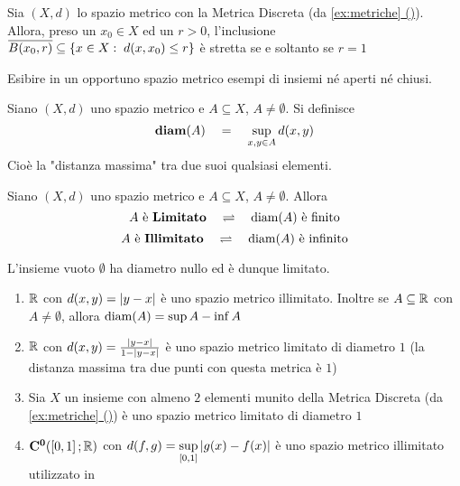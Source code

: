 \begin{proposition}
	Sia $(X,d)$ lo spazio metrico con la Metrica Discreta (da \hyperref[ex:dist_discr]{\cref*{ex:metriche} ()}).\\
	Allora, preso un $x_0 \in X$ ed un $r > 0$, l'inclusione $\overline{B(x_0,r)} \subseteq \left\{x \in X:\; d(x,x_0) \leq r\right\}$ è stretta se e soltanto se $r = 1$
\end{proposition}
\begin{exercise}
	Esibire in un opportuno spazio metrico esempi di insiemi né aperti né chiusi.
\end{exercise}

\begin{definition}
	Siano $(X,d)$ uno spazio metrico e $A\subseteq X$, $A \neq \emptyset$. Si definisce
	\[\boldsymbol{\operatorname{diam}}(A) \quad = \quad \sup\limits_{x,y \in A} d(x,y)\]
	Cioè la "distanza massima" tra due suoi qualsiasi elementi.
\end{definition}
\begin{definition}
	Siano $(X,d)$ uno spazio metrico e $A\subseteq X$, $A \neq \emptyset$. Allora
	\[A \text{ è \textbf{Limitato}} \quad \rightleftharpoons \quad \operatorname{diam}(A) \text{ è finito}\]
	\[A \text{ è \textbf{Illimitato}} \quad \rightleftharpoons \quad \operatorname{diam}(A) \text{ è infinito}\]
\end{definition}
\begin{note}
	L'insieme vuoto $\emptyset$ ha diametro nullo ed è dunque limitato.
\end{note}
\begin{example}\leavevmode\vspace*{-\baselineskip}
	\begin{enumerate}
		\item $\mathbb{R}$ con $d(x,y) = \left|y-x\right|$ è uno spazio metrico illimitato. Inoltre se $A \subseteq \mathbb{R}$ con $A \neq \emptyset$, allora $\operatorname{diam}(A) = \sup A - \inf A$
		\item $\mathbb{R}$ con $d(x,y) = \frac{\left|y-x\right|}{1-\left|y-x\right|}$ è uno spazio metrico limitato di diametro $1$ (la distanza massima tra due punti con questa metrica è $1$)
		\item Sia $X$ un insieme con almeno $2$ elementi munito della Metrica Discreta (da \hyperref[ex:dist_discr]{\cref*{ex:metriche} ()}) è uno spazio metrico limitato di diametro $1$ %
		\item $\mathbf{C^{0}}(\left[0,1\right]; \mathbb{R})$ con $d(f,g) = \sup\limits_{\left[0,1\right]} \left|g(x)-f(x)\right|$ è uno spazio metrico illimitato utilizzato in 
	\end{enumerate}
\end{example}
